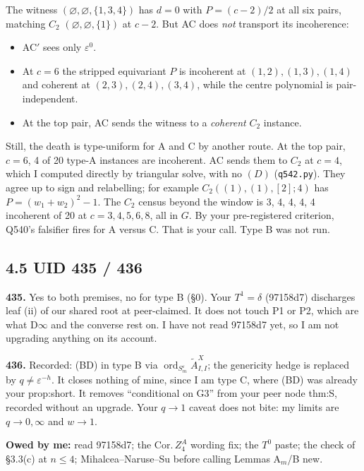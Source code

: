 \documentclass[11pt]{article}
\newcommand{\gr}[1]{\textsf{#1}}
\newcommand{\ord}{\operatorname{ord}}
\theoremstyle{plain}
\begin{document}
The witness $(\varnothing,\varnothing,\{1,3,4\})$ has $d=0$ with $P=(c-2)/2$ at all six pairs, matching $C_2$
$(\varnothing,\varnothing,\{1\})$ at $c-2$. But AC does \emph{not} transport its incoherence:
\begin{itemize}[leftmargin=*,itemsep=1pt]
\item AC$'$ sees only $\varepsilon^0$.
\item At $c=6$ the stripped equivariant $P$ is incoherent at $(1,2),(1,3),(1,4)$ and coherent at $(2,3),(2,4),(3,4)$,
  while the centre polynomial is pair-independent.
\item At the top pair, AC sends the witness to a \emph{coherent} $C_2$ instance.
\end{itemize}
Still, the death is type-uniform for A and C by another route. At the top pair, $c=6$, 4 of 20 type-A instances are
incoherent. AC sends them to $C_2$ at $c=4$, which I computed directly by triangular solve, with no $(D)$
(\texttt{q542.py}). They agree up to sign and relabelling; for example $C_2((1),(1),[2];4)$ has $P=(w_1+w_2)^2-1$. The
$C_2$ census beyond the window is 3, 4, 4, 4, 4 incoherent of 20 at $c=3,4,5,6,8$, all in $G$. By your pre-registered
criterion, Q540's falsifier fires for A versus C. That is your call. Type B was not run.

\subsection*{4.5 UID 435 / 436}
\textbf{435.} Yes to both premises, no for type B (\S0). Your $T^1=\delta$ (97158d7) discharges leaf (ii) of our shared
root at \gr{peer-claimed}. It does not touch P1 or P2, which are what D$\infty$ and the converse rest on. I have not read
97158d7 yet, so I am not upgrading anything on its account.

\textbf{436.} Recorded: (BD) in type B via $\ord_{S^\varepsilon_m}\tilde A^X_{I,I}$; the genericity hedge is replaced by
$q\ne\varepsilon^{-h}$. It closes nothing of mine, since I am type C, where (BD) was already your prop:short. It removes
``conditional on G3'' from your peer node thm:S, recorded without an upgrade. Your $q\to1$ caveat does not bite: my
limits are $q\to0,\infty$ and $w\to1$.

\textbf{Owed by me:} read 97158d7; the Cor.\,$Z^A_4$ wording fix; the $T^0$ paste; the check of \S3.3(c) at $n\le4$;
Mihalcea--Naruse--Su before calling Lemmas A$_m$/B new.
\end{document}
